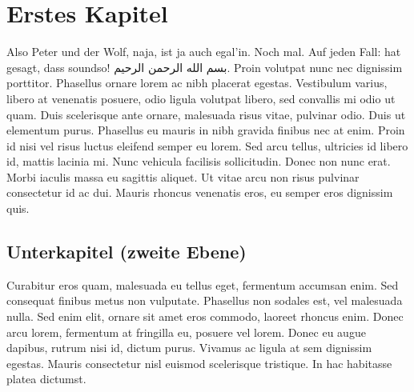 \documentclass[12pt,a4paper,parskip=half]{scrartcl}
\begin{document}


\OWmaketitle

\OWtoc


\section{Erstes Kapitel}

Also Peter und der Wolf, naja, ist ja auch egal'in. Noch mal. Auf jeden Fall: \cite{aghbari:nizwa-article} hat gesagt, dass soundso! \textarabic{بسم الله الرحمن الرحيم}. Proin volutpat nunc nec dignissim porttitor. Phasellus ornare lorem ac nibh placerat egestas. Vestibulum varius, libero at venenatis posuere, odio ligula volutpat libero, sed convallis mi odio ut quam. Duis scelerisque ante ornare, malesuada risus vitae, pulvinar odio. Duis ut elementum purus. Phasellus eu mauris in nibh gravida finibus nec at enim. Proin id nisi vel risus luctus eleifend semper eu lorem. Sed arcu tellus, ultricies id libero id, mattis lacinia mi. Nunc vehicula facilisis sollicitudin. Donec non nunc erat. Morbi iaculis massa eu sagittis aliquet. Ut vitae arcu non risus pulvinar consectetur id ac dui. Mauris rhoncus venenatis eros, eu semper eros dignissim quis.

\subsection{Unterkapitel (zweite Ebene)}

Curabitur eros quam, malesuada eu tellus eget, fermentum accumsan enim. Sed consequat finibus metus non vulputate. Phasellus non sodales est, vel malesuada nulla. Sed enim elit, ornare sit amet eros commodo, laoreet rhoncus enim. Donec arcu lorem, fermentum at fringilla eu, posuere vel lorem. Donec eu augue dapibus, rutrum nisi id, dictum purus. Vivamus ac ligula at sem dignissim egestas. Mauris consectetur nisl euismod scelerisque tristique. In hac habitasse platea dictumst.
\end{document}
